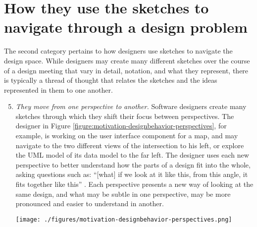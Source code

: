\section{How they use the sketches to navigate through a design problem}
\label{chapter:motivation:navigation}

The second category pertains to how designers use sketches to navigate the design space. While designers may create many different sketches over the course of a design meeting that vary in detail, notation, and what they represent, there is typically a thread of thought that relates the sketches and the ideas represented in them to one another. 

\begin{enumerate}
  \setcounter{enumi}{4}
  \item \emph{They move from one perspective to another.} Software designers create many sketches through which they shift their focus between perspectives. The designer in Figure \ref{figure:motivation-designbehavior-perspectives}, for example, is working on the user interface component for a map, and may navigate to the two different views of the intersection to his left, or explore the UML model of its data model to the far left. The designer uses each new perspective to better understand how the parts of a design fit into the whole, asking questions such as: ``[what] if we look at it like this, from this angle, it fits together like this'' \cite{petre2009insights}. Each perspective presents a new way of looking at the same design, and what may be subtle in one perspective, may be more pronounced and easier to understand in another. 
  
  \begin{figure*}[tbh]
  \centering
  \texttt{[image: ./figures/motivation-designbehavior-perspectives.png]}
  \caption{The designer navigates between different types of diagrams and abstractions.}
  \label{figure:motivation-designbehavior-perspectives}
\end{figure*}  


\end{enumerate}
